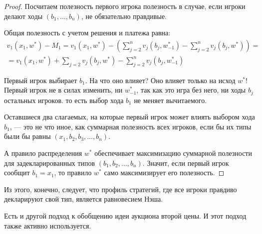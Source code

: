 \begin{proof}
Посчитаем полезность первого игрока полезность в случае, если игроки делают ходы $ (b_{1},\ldots,b_{n}) $, не обязательно правдивые.

Общая полезность с учетом решения и платежа равна:
\begin{multline}
v_{1}(x_{1},w^{*})-M_{1}=v_{1}(x_{1},w^{*})-\left(\sum_{j=2}^{n}v_{j}(b_{j},w_{-1}^{*})-\sum_{j=2}^{n}v_{j}(b_{j},w^{*})\right)=\\
=v_{1}(x_{1},w^{*})+\sum_{j=2}v_{j}(b_{j},w^{*})-\sum_{j=2}^{n}v_{j}(b_{j},w_{-1}^{*})
\end{multline}

Первый игрок выбирает $ b_{1} $. На что оно влияет? Оно влияет только на исход $ w^{*} $! Первый игрок не в силах изменить, ни  $ w_{-1}^{*} $, так как это игра без него, ни ходы $ b_{j} $ остальных игроков. то есть выбор хода $ b_{1} $ не меняет вычитаемого.

Оставшиеся два слагаемых, на которые первый игрок может влиять выбором хода $ b_{1} $, — это не что иное, как суммарная полезность всех игроков, если бы их типы были бы равны $ (x_{1},b_{2},b_{3},\ldots,b_{n}) $.

А правило распределения $ w^{*} $ обеспечивает максимизацию суммарной полезности для задекларированных типов $ (b_{1},b_{2},\ldots,b_{n}) $. Значит, если первый игрок сообщит $ b_{1}=x_{1} $, то правило $ w^{*} $ само максимизирует его полезность.

\end{proof}

Из этого, конечно, следует, что профиль стратегий, где все игроки правдиво декларируют свой тип, является равновесием Нэша.







Есть и другой подход к обобщению идеи аукциона второй цены. И этот подход также активно используется.

